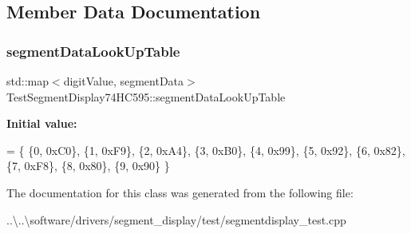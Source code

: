 \subsection{Member Data Documentation}
\mbox{\label{class_test_segment_display74_h_c595_a5adfa8af8f14cedfff1ae6129d423355}} 
\subsubsection{\texorpdfstring{segment\+Data\+Look\+Up\+Table}{segmentDataLookUpTable}}
{\footnotesize\ttfamily std\+::map$<$digit\+Value, segment\+Data$>$ Test\+Segment\+Display74\+H\+C595\+::segment\+Data\+Look\+Up\+Table}

{\bfseries Initial value\+:}
\begin{DoxyCode}
=
    \{
        \{0, 0xC0\}, \{1, 0xF9\}, \{2, 0xA4\}, \{3, 0xB0\}, \{4, 0x99\},
        \{5, 0x92\}, \{6, 0x82\}, \{7, 0xF8\}, \{8, 0x80\}, \{9, 0x90\}
    \}
\end{DoxyCode}


The documentation for this class was generated from the following file\+:\begin{DoxyCompactItemize}
\item 
..\textbackslash{}..\textbackslash{}software/drivers/segment\+\_\+display/test/segmentdisplay\+\_\+test.\+cpp\end{DoxyCompactItemize}
